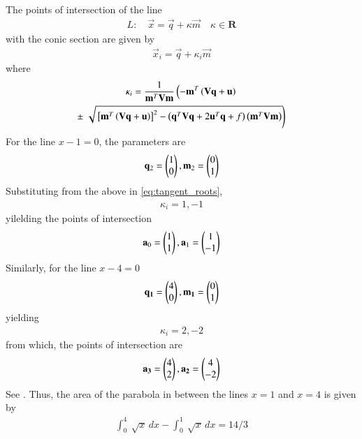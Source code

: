 The points of intersection of the line 
\begin{align}
	L: \quad \vec{x} = \vec{q} + \kappa \vec{m} \quad \kappa \in \mathbf{R}
\label{eq:conic_tangent}
\end{align}
with the conic section are given by
\begin{align}
\vec{x}_i = \vec{q} + \kappa_i \vec{m}
\label{eq:conic_tangent_pts}
\end{align}
%
where
{\tiny
\begin{multline}
\kappa_i = \frac{1}
{
\mathbf{m}^T\mathbf{V}\mathbf{m}
}
\left(-\mathbf{m}^T\left(\mathbf{V}\mathbf{q}+\mathbf{u}\right)\right.
\\
\pm
\left.\sqrt{
{}\left[
\mathbf{m}^T\left(\mathbf{V}\mathbf{q}+\mathbf{u}\right)
\right]^2
-
\left(
\mathbf{q}^T\mathbf{V}\mathbf{q} + 2\mathbf{u}^T\mathbf{q} +f
\right)
\left(\mathbf{m}^T\mathbf{V}\mathbf{m}\right)
}
\right)
\label{eq:tangent_roots}
\end{multline}
}
\fi
For the line $x-1=0$, the parameters are  
\begin{align}
	\mathbf{q}_2=\begin{pmatrix}1\\0\end{pmatrix},
	\mathbf{m}_2=\begin{pmatrix}0\\1\end{pmatrix}
\end{align}
Substituting from the above in 
\eqref{eq:tangent_roots},
\begin{align}
\kappa_i=1,-1
\end{align}
yilelding 
the points of intersection 
\begin{align}
	\mathbf{a}_0=\begin{pmatrix}1\\1\end{pmatrix},
	\mathbf{a}_1=\begin{pmatrix}1\\-1\end{pmatrix}
\end{align}
Similarly, 
for the line $x-4=0$ 
\begin{align}
\mathbf{q_1}=\begin{pmatrix}4\\0\end{pmatrix},
\mathbf{m_1}=\begin{pmatrix}0\\1\end{pmatrix}
\end{align}
yielding
\begin{align}
\kappa_i=2,-2
\end{align}
from which, the points of 
intersection are
\begin{align}
\mathbf{a_3}=\begin{pmatrix}4\\2\end{pmatrix},
\mathbf{a_2}=\begin{pmatrix}4\\-2\end{pmatrix}
\end{align}
		See .
Thus, 
the area of the parabola in between the lines $x=1$ and $x=4$ is given by
\begin{align}
\int_{0}^{4} \ \sqrt{x} \,dx-\int_{0}^{1} \ \sqrt{x} \,dx
=14/3
\end{align}
